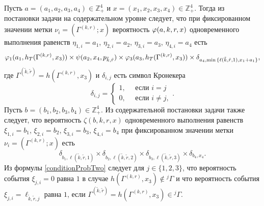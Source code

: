 \documentclass[a4paper,12pt,russian]{extarticle}
\newcommand{\G}{\Gamma}
\newcommand{\ga}[1]{\Gamma^{\left( #1 \right)} }
\begin{document}
Пусть $a=(a_1, a_2, a_3, a_4) \in \mathbb{Z}_+^4$ и $x=(x_1, x_2, x_3, x_4) \in \mathbb{Z}_+^4$. Тогда из постановки задачи на содержательном уровне следует, что при фиксированном значении метки $\nu_i=(\ga{k,r}; x)$ вероятность $\varphi(a,k,r,x)$ одновременного выполнения равенств $\eta_{1,i}=a_1$, $\eta_{2,i}=a_2$, $\eta_{3,i}=a_3$, $\eta_{4,i}=a_4$ есть 
\begin{equation}
\vp_1(a_1,h_T(\ga{{k},{r}},x_3)) \times \psi(a_2,x_4, p_{\tilde{k},\tilde{r}}) \times \vp_3(a_3,h_T(\ga{{k},{r}},x_3))
\times \delta_{a_4,\min{\{\ell(\tilde{k},\tilde{r},1), x_1+a_1}\}},
\label{conditionProbOne}
\end{equation}
где $\ga{\tilde{k},\tilde{r}}=h(\ga{k,r},x_3)$ и $\delta_{i,j}$ есть символ Кронекера
\begin{equation*}
\delta_{i,j}=\begin{cases} 1, \quad \text{ если }i=j\\0, \quad \text{ если } i\neq j,
\end{cases}.
\end{equation*}
Пусть $b=(b_1, b_2, b_3, b_4) \in \mathbb{Z}_+^4$. Из содержательной постановки задачи также следует, что вероятность $\zeta(b, k, r, x)$ одновременного выполнения равенств $\xi_{1,i}=b_1$, $\xi_{2,i}=b_2$, $\xi_{3,i}=b_3$, $\xi_{4,i}=b_4$ при фиксированном значении метки $\nu_i=(\ga{k,r}; x)$ есть
\begin{equation}
\delta_{b_1,\ell(\tilde{k},\tilde{r},1)} \times \delta_{b_2,\ell(\tilde{k},\tilde{r},2)} \times 
\delta_{b_3,\ell(\tilde{k},\tilde{r},3)} \times \delta_{b_4,x_4}.
\label{conditionProbTwo}
\end{equation}
Из формулы \eqref{conditionProbTwo} следует для $j\in \{1, 2, 3\}$, что вероятность события $\xi_{j,i}=0$ равна $1$ в случае $h(\ga{k,r},x_3)\notin {}^j\G$ и что вероятность события $\xi_{j,i}=\ell_{\tilde{k},\tilde{r},j}$ равна $1$, если $\ga{\tilde{k},\tilde{r}}=h(\ga{k,r},x_3)\in {}^j\G$.
\end{document}
